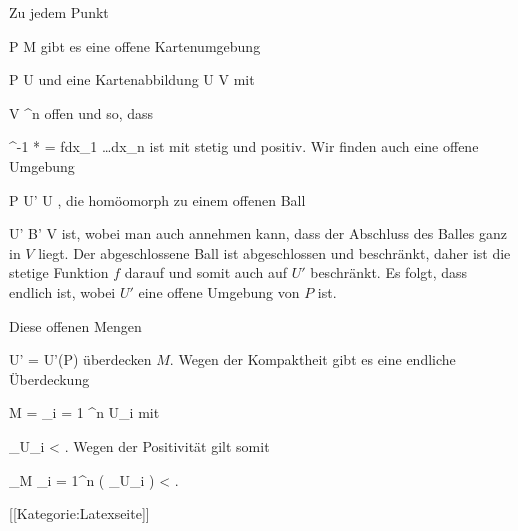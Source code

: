 Zu jedem Punkt

\mavergleichskette
{\vergleichskette
{ P
}
{ \in }{ M
}
{  }{
}
{    }{
}
{   }{
}
}
{}{}{}
gibt es eine offene Kartenumgebung

\mavergleichskette
{\vergleichskette
{ P
}
{ \in }{ U
}
{  }{
}
{    }{
}
{   }{
}
}
{}{}{}
und eine Kartenabbildung
\maabbdisp {\alpha} { U } { V
} {}
mit

\mavergleichskette
{\vergleichskette
{ V
}
{ \subseteq }{ \R^n
}
{  }{
}
{    }{
}
{   }{
}
}
{}{}{}
offen und so, dass

\mavergleichskette
{\vergleichskette
{ \alpha^{-1 *} \omega
}
{ = }{ fdx_1 \wedge \ldots \wedge dx_n
}
{  }{
}
{    }{
}
{   }{
}
}
{}{}{}
ist mit
 stetig und positiv. Wir finden auch eine offene Umgebung

\mavergleichskette
{\vergleichskette
{ P
}
{ \in }{ U'
}
{ \subseteq }{ U
}
{    }{
}
{   }{
}
}
{}{}{,}
die homöomorph zu einem offenen Ball

\mavergleichskette
{\vergleichskette
{ U'
}
{ \cong }{ B'
}
{ \subseteq }{ V
}
{    }{
}
{   }{
}
}
{}{}{}
ist, wobei man auch annehmen kann, dass der Abschluss des Balles ganz in $V$ liegt. Der abgeschlossene Ball ist abgeschlossen und beschränkt, daher ist die stetige Funktion $f$ darauf und somit auch auf $U'$ beschränkt. Es folgt, dass
 endlich ist, wobei $U'$ eine offene Umgebung von $P$ ist.

Diese offenen Mengen

\mavergleichskette
{\vergleichskette
{ U'
}
{ = }{ U'(P)
}
{  }{
}
{    }{
}
{   }{
}
}
{}{}{}
überdecken $M$. Wegen der Kompaktheit gibt es eine endliche Überdeckung

\mavergleichskettedisp
{\vergleichskette
{ M
}
{ =} { \bigcup_{i = 1} ^n U_i
}
{ } {
}
{ } {
}
{ } {
}
}
{}{}{}
mit

\mavergleichskettedisp
{\vergleichskette
{ \int_{U_i } \omega
}
{ <} { \infty
}
{ } {
}
{ } {
}
{ } {
}
}
{}{}{.}
Wegen der Positivität gilt somit

\mavergleichskettedisp
{\vergleichskette
{ \int_{M} \omega
}
{ \leq} { \sum_{i = 1}^n  \left(  \int_{U_i } \omega  \right)
}
{ <} { \infty
}
{ } {
}
{ } {
}
}
{}{}{.}

 [[Kategorie:Latexseite]]
